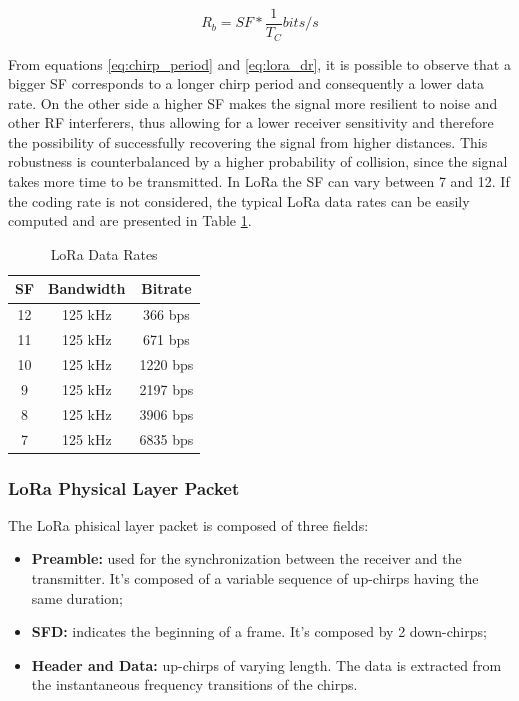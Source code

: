 \begin{equation}
\label{eq:lora_dr}
R_b = SF*\frac{1}{T_C} bits/s
\end{equation}

From equations \ref{eq:chirp_period} and \ref{eq:lora_dr}, it is possible to observe that a bigger \gls{SF} corresponds to a longer chirp period and consequently a lower data rate. On the other side a higher \gls{SF} makes the signal more resilient to noise and other \gls{RF} interferers, thus allowing for a lower receiver sensitivity and therefore the possibility of successfully recovering the signal from higher distances. This robustness is counterbalanced by a higher probability of collision, since the signal takes more time to be transmitted. In LoRa the \gls{SF} can vary between 7 and 12. If the coding rate is not considered, the typical LoRa data rates can be easily computed and are presented in Table \ref{tab:lora_dr}.

\begin{table}[]
\centering

\begin{tabular}{|c|c|c|}
\hline
\textbf{SF} & \textbf{Bandwidth} & \textbf{Bitrate} \\ \hline
 12 & 125 kHz & 366 bps  \\ \hline
 11 & 125 kHz & 671 bps \\ \hline
 10 & 125 kHz & 1220 bps \\ \hline
  9 & 125 kHz & 2197 bps \\ \hline
  8 & 125 kHz & 3906 bps \\ \hline 
  7 & 125 kHz & 6835 bps \\ \hline 
\end{tabular}
\caption{LoRa Data Rates}
\label{tab:lora_dr}

\end{table}

\subsubsection{LoRa Physical Layer Packet}

The LoRa phisical layer packet is composed of three fields:

\begin{itemize}

\item \textbf{Preamble:} used for the synchronization between the receiver and the transmitter. It's composed of a variable sequence of up-chirps having the same duration;

\item \textbf{\gls{SFD}:} indicates the beginning of a frame. It's composed by 2 down-chirps;

\item \textbf{Header and Data:} up-chirps of varying length. The data is extracted from the instantaneous frequency transitions of the chirps.

\end{itemize}

